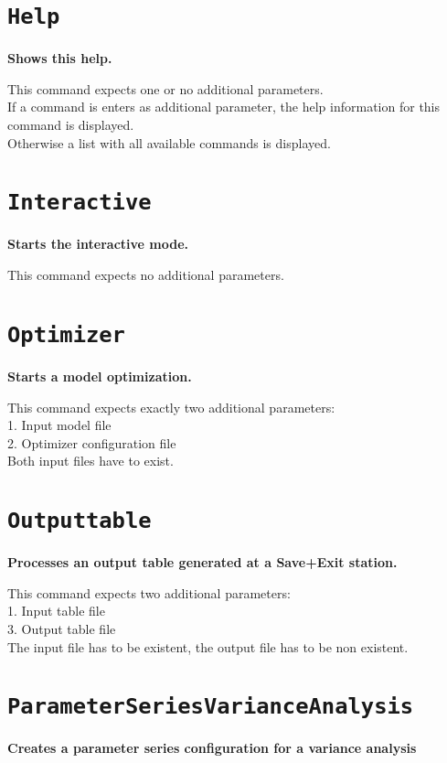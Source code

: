 \section{\texttt{Help}}

\textbf{Shows this help.}

This command expects one or no additional parameters.\\
If a command is enters as additional parameter, the help information for this command is displayed.\\
Otherwise a list with all available commands is displayed.

\section{\texttt{Interactive}}

\textbf{Starts the interactive mode.}

This command expects no additional parameters.

\section{\texttt{Optimizer}}

\textbf{Starts a model optimization.}

This command expects exactly two additional parameters:\\
1. Input model file\\
2. Optimizer configuration file\\
Both input files have to exist.

\section{\texttt{Outputtable}}

\textbf{Processes an output table generated at a Save+Exit station.}

This command expects two additional parameters:\\
1. Input table file\\
3. Output table file\\
The input file has to be existent, the output file has to be non existent.

\section{\texttt{ParameterSeriesVarianceAnalysis}}

\textbf{Creates a parameter series configuration for a variance analysis}

